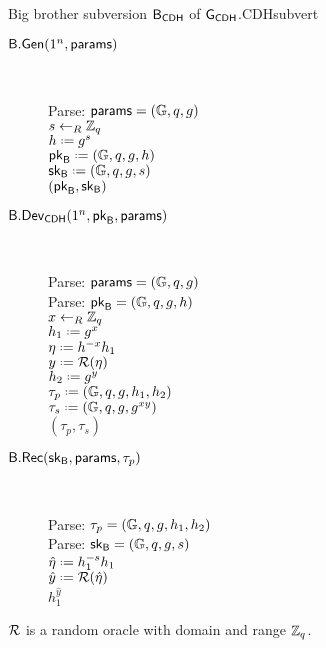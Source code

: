 \begin{boxfigGame}{Big brother subversion $\mathsf{B}_{\mathsf{CDH}}$ of $\operatorname{\mathsf{G}}_{\mathsf{CDH}}$.}{CDHsubvert}
  \begin{description}
 	\item[\underline{$\mathsf{B}.\mathsf{Gen}(1^n,\mathsf{params})$}] ~
 	
 		Parse: $\mathsf{params} = (\mathbb{G},q,g)$ \\
 		$s\leftarrow_R \mathbb{Z}_q$ \\
 		$h \defeq g^s$ \\
 		$\bbpk \defeq (\cgroup,\order,\generator,h)$ \\
 		$\bbsk \defeq (\cgroup,\order,\generator,s)$ \\
 		\Ret $(\mathsf{pk}_{\mathsf{B}},\mathsf{sk}_{\mathsf{B}})$

	\item[\underline{$\mathsf{B}.\mathsf{Dev}_{\mathsf{CDH}}(1^n,\mathsf{pk}_{\mathsf{B}},\mathsf{params})$}] ~
		
		Parse: $\mathsf{params} = (\mathbb{G},q,g)$ \\
		Parse: $\mathsf{pk}_{\mathsf{B}} = (\mathbb{G},q,g,h)$ \\
		$x\leftarrow_R\mathbb{Z}_q$ \\
		$h_1 \defeq g^x$ \\
		$\eta\defeq h^{-x}h_1$ \\
		$y\defeq \RO(\eta)$ \\
		$h_2 \defeq g^y$ \\ 		
 		$\tau_p \defeq (\cgroup,\order,\generator,h_1,h_2)$ \\
 		$\tau_s \defeq (\cgroup,\order,\generator,g^{xy})$ \\
 		\Ret $(\tau_p,\tau_s)$
		
	\item[\underline{$\mathsf{B}.\mathsf{Rec}(\mathsf{sk}_{\mathsf{B}},\mathsf{params},\tau_p)$}] ~
	
		Parse: $\tau_p = (\mathbb{G},q,g,h_1,h_2)$ \\
		Parse: $\mathsf{sk}_{\mathsf{B}} = (\mathbb{G},q,g,s)$ \\
		$\hat{\eta}\defeq h_1^{-s}h_1$ \\
		$\hat{y} \defeq \RO(\hat{\eta})$ \\
		\Ret $h_1^{\hat{y}}$
  \end{description}
  $\operatorname{\mathcal{R}}$ is a random oracle with domain and range $\mathbb{Z}_q$.
\end{boxfigGame}


